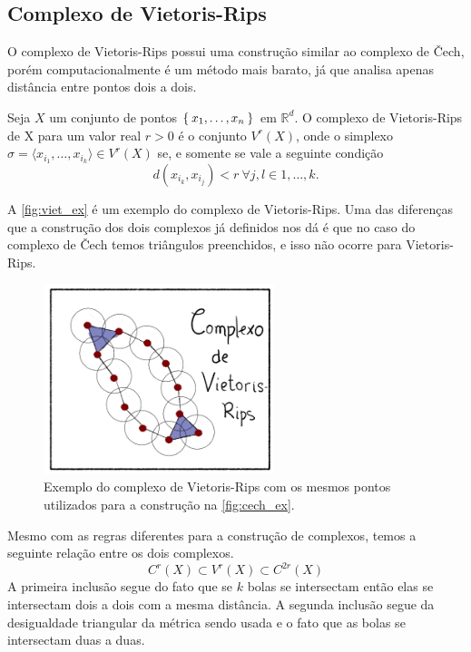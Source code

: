 \subsection{Complexo de Vietoris-Rips}
O complexo de Vietoris-Rips possui uma construção similar ao complexo de \v{C}ech,
porém computacionalmente é um método mais barato, já que analisa apenas distância
entre pontos dois a dois.
\begin{defi}
  Seja $X$ um conjunto de pontos $\Set{x_1, \dots, x_n}$ em $\mathbb{R}^d$. O complexo
  de Vietoris-Rips de X para um valor real $r>0$ é o conjunto $V^r(X)$, onde o simplexo
  $\sigma = \langle x_{i_1}, \dots, x_{i_k} \rangle \in V^r(X)$ se, e somente se vale a seguinte
  condição
  \begin{equation*}
    d(x_{i_k}, x_{i_j}) < r \ \forall j,l \in{1,\dots,k}.
  \end{equation*}
\end{defi}
A \autoref{fig:viet_ex} é um exemplo do complexo de Vietoris-Rips. Uma das diferenças
que a construção dos dois complexos já definidos nos dá é que no caso do complexo
de \v{C}ech temos triângulos preenchidos, e isso não ocorre para Vietoris-Rips.
\begin{figure}[!htpb]
  \centering
  \includegraphics[width=0.6\textwidth]{images/ComplexRips.png}
  \caption{Exemplo do complexo de Vietoris-Rips com os mesmos pontos utilizados
  para a construção na \autoref{fig:cech_ex}.}
  \label{fig:viet_ex}
  \fautor
\end{figure}

Mesmo com as regras diferentes para a construção de complexos, temos a seguinte
relação entre os dois complexos.
\begin{equation}
  \label{eq:viet_cech}
  C^r(X) \subset V^r(X) \subset C^{2r}(X)
\end{equation}
A primeira inclusão segue do fato que se $k$ bolas se intersectam então elas se
intersectam dois a dois com a mesma distância. A segunda inclusão segue da
desigualdade triangular da métrica sendo usada e o fato que as bolas se
intersectam duas a duas.

